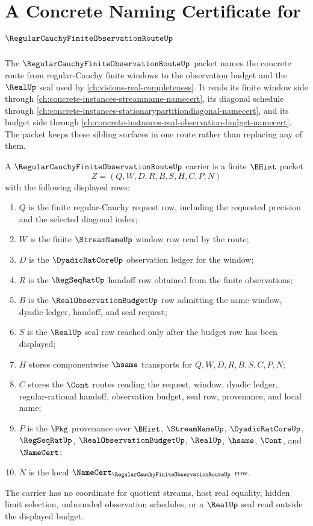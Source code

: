 \chapter{A Concrete Naming Certificate for $\RegularCauchyFiniteObservationRouteUp$}
\label{ch:concrete-instances-regular-cauchy-finite-observation-route-namecert}

The $\RegularCauchyFiniteObservationRouteUp$ packet names the concrete route from regular-Cauchy finite windows to the observation budget and the $\RealUp$ seal used by \autoref{ch:visions-real-completeness}. It reads its finite window side through \autoref{ch:concrete-instances-streamname-namecert}, its diagonal schedule through \autoref{ch:concrete-instances-stationarypartitiondiagonal-namecert}, and its budget side through \autoref{ch:concrete-instances-real-observation-budget-namecert}. The packet keeps these sibling surfaces in one route rather than replacing any of them.

\begin{definition}
\label{def:regular-cauchy-finite-observation-route-carrier}
A $\RegularCauchyFiniteObservationRouteUp$ carrier is a finite $\BHist$ packet
$$
Z=(Q,W,D,R,B,S,H,C,P,N)
$$
with the following displayed rows:
\begin{enumerate}
\item $Q$ is the finite regular-Cauchy request row, including the requested precision and the selected diagonal index;
\item $W$ is the finite $\StreamNameUp$ window row read by the route;
\item $D$ is the $\DyadicRatCoreUp$ observation ledger for the window;
\item $R$ is the $\RegSeqRatUp$ handoff row obtained from the finite observations;
\item $B$ is the $\RealObservationBudgetUp$ row admitting the same window, dyadic ledger, handoff, and seal request;
\item $S$ is the $\RealUp$ seal row reached only after the budget row has been displayed;
\item $H$ stores componentwise $\hsame$ transports for $Q,W,D,R,B,S,C,P,N$;
\item $C$ stores the $\Cont$ routes reading the request, window, dyadic ledger, regular-rational handoff, observation budget, seal row, provenance, and local name;
\item $P$ is the $\Pkg$ provenance over $\BHist$, $\StreamNameUp$, $\DyadicRatCoreUp$, $\RegSeqRatUp$, $\RealObservationBudgetUp$, $\RealUp$, $\hsame$, $\Cont$, and $\NameCert$;
\item $N$ is the local $\NameCert_{\RegularCauchyFiniteObservationRouteUp}$ row.
\end{enumerate}
The carrier has no coordinate for quotient streams, host real equality, hidden limit selection, unbounded observation schedules, or a $\RealUp$ seal read outside the displayed budget.
\end{definition}

